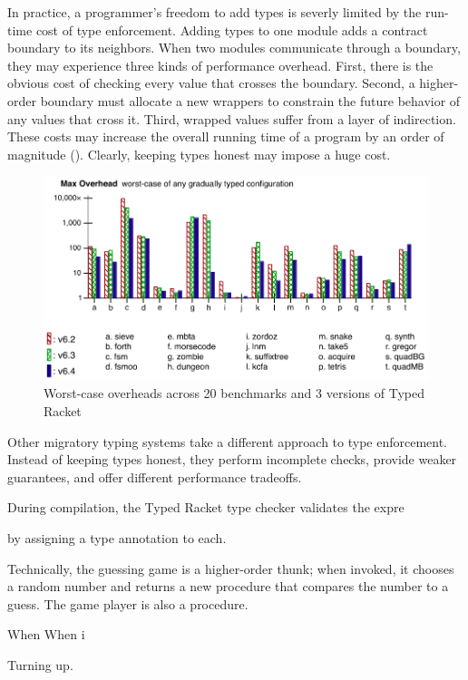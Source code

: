 In practice, a programmer's freedom to add types is severly limited by
 the run-time cost of type enforcement.
Adding types to one module adds a contract boundary to its neighbors.
When two modules communicate through a boundary, they may experience three kinds
 of performance overhead.
First, there is the obvious cost of checking every value that crosses the
 boundary.
Second, a higher-order boundary must allocate a new wrappers to constrain the
 future behavior of any values that cross it.
Third, wrapped values suffer from a layer of indirection.
These costs may increase the overall running time of a program by an order
 of magnitude ().
Clearly, keeping types honest may impose a huge cost.

\begin{figure}[h]
  \includegraphics[width=0.8\columnwidth]{src/jfp-2019-max.png}
  \caption{Worst-case overheads across 20 benchmarks and 3 versions of Typed Racket~\cite{gtnffvf-jfp-2019}}
  \label{fig:max-overhead}
\end{figure}

Other migratory typing systems take a different approach to type enforcement.
Instead of keeping types honest, they perform incomplete checks,
 provide weaker guarantees, and offer different performance tradeoffs.



During compilation, the Typed Racket type checker validates the expre

by assigning a type
annotation to each.

Technically, the guessing game is a higher-order thunk; when invoked, it
chooses a random number and returns a new procedure that compares the number
to a guess.
The game player is also a procedure.


When
When i

Turning up.

